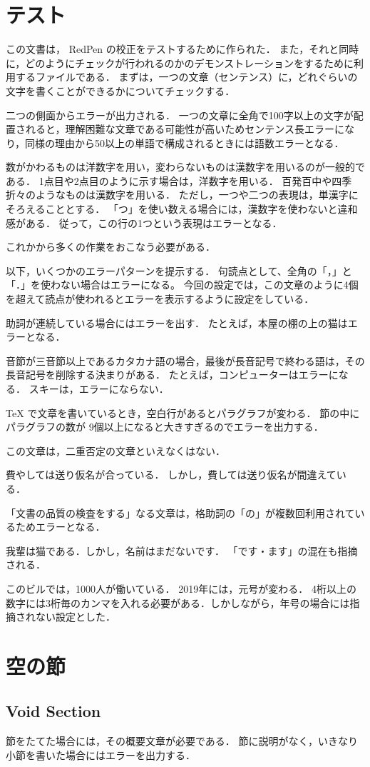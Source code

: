 \section{テスト}
この文書は， RedPen の校正をテストするために作られた．
また，それと同時に，どのようにチェックが行われるのかのデモンストレーションをするために利用するファイルである．
まずは，一つの文章（センテンス）に，どれぐらいの文字を書くことができるかについてチェックする．

二つの側面からエラーが出力される．
一つの文章に全角で100字以上の文字が配置されると，理解困難な文章である可能性が高いためセンテンス長エラーになり，同様の理由から50以上の単語で構成されるときには語数エラーとなる．

数がかわるものは洋数字を用い，変わらないものは漢数字を用いるのが一般的である．
1点目や2点目のように示す場合は，洋数字を用いる．
百発百中や四季折々のようなものは漢数字を用いる．
ただし，一つや二つの表現は，単漢字にそろえることとする．
「つ」を使い数える場合には，漢数字を使わないと違和感がある．
従って，この行の1つという表現はエラーとなる．

これかから多くの作業をおこなう必要がある．

以下，いくつかのエラーパターンを提示する．
句読点として、全角の「，」と「．」を使わない場合はエラーになる。
今回の設定では，この文章のように4個を超えて読点が使われるとエラーを表示するように設定をしている．

助詞が連続している場合にはエラーを出す．
たとえば，本屋の棚の上の猫はエラーとなる．

音節が三音節以上であるカタカナ語の場合，最後が長音記号で終わる語は，その長音記号を削除する決まりがある．
たとえば，コンピューターはエラーになる．
スキーは，エラーにならない．

TeX で文章を書いているとき，空白行があるとパラグラフが変わる．
節の中にパラグラフの数が 9個以上になると大きすぎるのでエラーを出力する．

この文章は，二重否定の文章といえなくはない．

費やしては送り仮名が合っている．
しかし，費しては送り仮名が間違えている．

「文書の品質の検査をする」なる文章は，格助詞の「の」が複数回利用されているためエラーとなる．

我輩は猫である．しかし，名前はまだないです．
「です・ます」の混在も指摘される．

このビルでは，1000人が働いている．
2019年には，元号が変わる．
4桁以上の数字には3桁毎のカンマを入れる必要がある．しかしながら，年号の場合には指摘されない設定とした．

\section{空の節}
\subsection{Void Section}
節をたてた場合には，その概要文章が必要である．
節に説明がなく，いきなり小節を書いた場合にはエラーを出力する．


